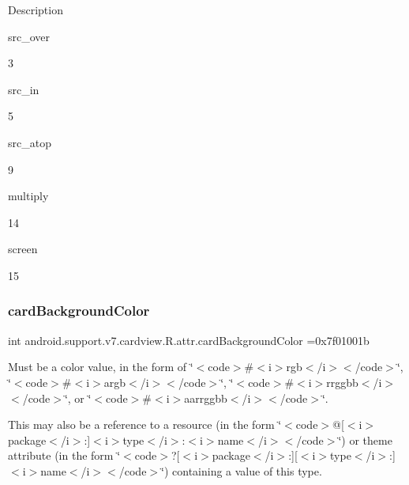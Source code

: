 Description 

{\ttfamily src\+\_\+over}

3

{\ttfamily src\+\_\+in}

5

{\ttfamily src\+\_\+atop}

9

{\ttfamily multiply}

14

{\ttfamily screen}

15\mbox{\label{classandroid_1_1support_1_1v7_1_1cardview_1_1R_1_1attr_ac0ef6047144c1884ba9c7e9d77f6f1ae}} 
\subsubsection{\texorpdfstring{card\+Background\+Color}{cardBackgroundColor}}
{\footnotesize\ttfamily int android.\+support.\+v7.\+cardview.\+R.\+attr.\+card\+Background\+Color =0x7f01001b\hspace{0.3cm}{\ttfamily [static]}}

Must be a color value, in the form of \char`\"{}$<$code$>$\#$<$i$>$rgb$<$/i$>$$<$/code$>$\char`\"{}, \char`\"{}$<$code$>$\#$<$i$>$argb$<$/i$>$$<$/code$>$\char`\"{}, \char`\"{}$<$code$>$\#$<$i$>$rrggbb$<$/i$>$$<$/code$>$\char`\"{}, or \char`\"{}$<$code$>$\#$<$i$>$aarrggbb$<$/i$>$$<$/code$>$\char`\"{}. 

This may also be a reference to a resource (in the form \char`\"{}$<$code$>$@\mbox{[}$<$i$>$package$<$/i$>$\+:\mbox{]}$<$i$>$type$<$/i$>$\+:$<$i$>$name$<$/i$>$$<$/code$>$\char`\"{}) or theme attribute (in the form \char`\"{}$<$code$>$?\mbox{[}$<$i$>$package$<$/i$>$\+:\mbox{]}\mbox{[}$<$i$>$type$<$/i$>$\+:\mbox{]}$<$i$>$name$<$/i$>$$<$/code$>$\char`\"{}) containing a value of this type. \mbox{\label{classandroid_1_1support_1_1v7_1_1cardview_1_1R_1_1attr_a6d39a018270a4e6fe065c3ba400817ad}} 
